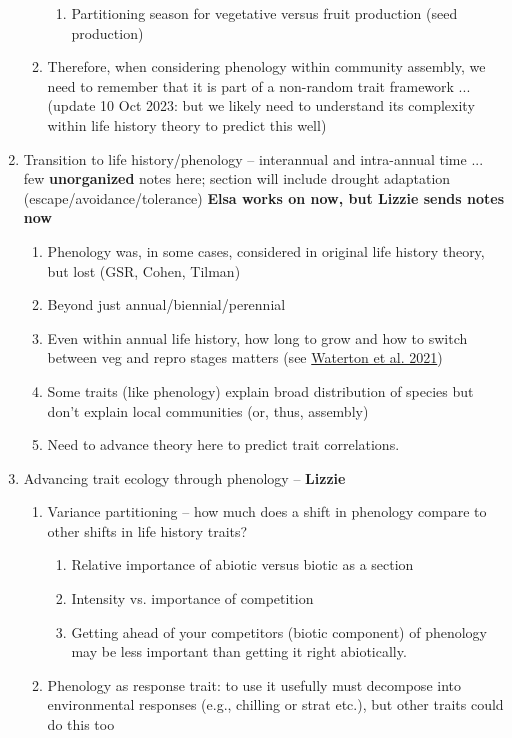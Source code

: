 \documentclass[11pt]{article}
\begin{document}
\begin{enumerate}
\begin{enumerate}
\begin{enumerate}
\item Partitioning season for vegetative versus fruit production (seed production)
\end{enumerate}
\item Therefore, when considering phenology within community assembly, we need to remember that it is part of a non-random trait framework ...(update 10 Oct 2023: but we likely need to understand its complexity within life history theory to predict this well)
\end{enumerate}
\item Transition to life history/phenology -- interannual and intra-annual time ... few {\bf unorganized} notes here; section will include drought adaptation (escape/avoidance/tolerance) {\bf Elsa works on now, but Lizzie sends notes now}
\begin{enumerate}
\item Phenology was, in some cases, considered in original life history theory, but lost (GSR, Cohen, Tilman)
\item Beyond just annual/biennial/perennial 
\item Even within annual life history, how long to grow and how to switch between veg and repro stages matters (see \href{https://onlinelibrary.wiley.com/doi/full/10.1111/eva.13145}{Waterton et al. 2021})
\item Some traits (like phenology) explain broad distribution of species but don't explain local communities (or, thus, assembly)
\item Need to advance theory here to predict trait correlations. 
\end{enumerate}
\item Advancing trait ecology through phenology -- {\bf Lizzie} %
\begin{enumerate}
\item Variance partitioning -- how much does a shift in phenology compare to other shifts in life history traits?
\begin{enumerate}
\item Relative importance of abiotic versus biotic as a section
\item Intensity vs. importance of competition %
\item Getting ahead of your competitors (biotic component) of phenology may be less important than getting it right abiotically.
\end{enumerate}
\item Phenology as response trait:  to use it usefully must decompose into environmental responses (e.g., chilling or strat etc.), but other traits could do this too %
\end{enumerate}


\end{enumerate}
\end{document}
